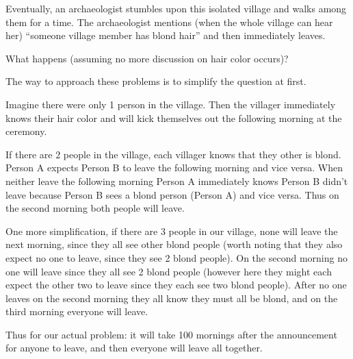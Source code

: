 \documentclass[addpoints]{exam}
\begin{document}
\begin{questions}
  Eventually, an archaeologist stumbles upon this isolated village and walks
  among them for a time. The archaeologist mentions (when the whole village can
  hear her) ``someone village member has blond hair'' and then immediately
  leaves.

  What happens (assuming no more discussion on hair color occurs)?

  \begin{solution}
    The way to approach these problems is to simplify the question at first.

    Imagine there were only 1 person in the village. Then the villager
    immediately knows their hair color and will kick themselves out the
    following morning at the ceremony.

    If there are 2 people in the village, each villager knows that they other is
    blond. Person A expects Person B to leave the following morning and vice
    versa. When neither leave the following morning Person A immediately knows
    Person B didn't leave because Person B sees a blond person (Person A) and
    vice versa. Thus on the second morning both people will leave.

    One more simplification, if there are 3 people in our village, none will
    leave the next morning, since they all see other blond people (worth noting
    that they also expect no one to leave, since they see 2 blond people). On
    the second morning no one will leave since they all see 2 blond people 
    (however here they might each expect the other two to leave since they each
    see two blond people). After no one leaves on the second morning they all
    know they must all be blond, and on the third morning everyone will leave.

    Thus for our actual problem: it will take 100 mornings after the
    announcement for anyone to leave, and then everyone will leave all together.
  \end{solution}
\end{questions}
\end{document}
